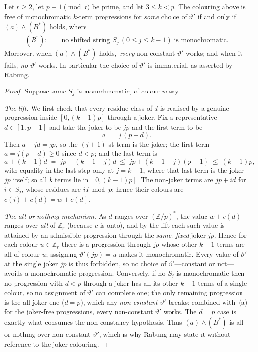\begin{proposition}\label{p:bstar}
Let $r\ge2$, let $p\equiv1\pmod r$ be prime, and let $3\le k<p$. The colouring above is free of monochromatic
$k$-term progressions for \emph{some} choice of $\vartheta'$ if and only if
$(a)\wedge(B^{*})$ holds, where
\[
  (B^{*}):\qquad \text{no shifted string }S_j\ (0\le j\le k-1)\text{ is monochromatic.}
\]
Moreover, when $(a)\wedge(B^{*})$ holds, \emph{every} non-constant $\vartheta'$
works; and when it fails, \emph{no} $\vartheta'$ works. In particular the choice of
$\vartheta'$ is immaterial, as asserted by Rabung.
\end{proposition}

\begin{proof}
Suppose some $S_j$ is monochromatic, of colour $w$ say.

\emph{The lift.} We first check that every residue class of $d$ is realised by a
genuine progression inside $[0,(k-1)p]$ through a joker. Fix a representative
$d\in[1,p-1]$ and take the joker to be $jp$ and the first term to be
\[
  a \;=\; j\,(p-d).
\]
Then $a+jd=jp$, so the $(j+1)$-st term is the joker; the first term
$a=j(p-d)\ge0$ since $d<p$; and the last term is
\[
  a+(k-1)d \;=\; jp+(k-1-j)d \;\le\; jp+(k-1-j)(p-1) \;\le\; (k-1)p ,
\]
with equality in the last step only at $j=k-1$, where that last term is the
joker $jp$ itself; so all $k$ terms lie in $[0,(k-1)p]$. The non-joker terms are $jp+id$ for
$i\in S_j$, whose residues are $id \bmod p$; hence their colours are
$c(i)+c(d)=w+c(d)$.

\emph{The all-or-nothing mechanism.} As $d$ ranges over $(\mathbb{Z}/p)^{*}$, the
value $w+c(d)$ ranges over \emph{all} of $\mathbb{Z}_r$ (because $c$ is onto), and
by the lift each such value is attained by an admissible progression through the
\emph{same, fixed} joker $jp$. Hence for each colour $u\in\mathbb{Z}_r$ there is a
progression through $jp$ whose other $k-1$ terms are all of colour $u$; assigning
$\vartheta'(jp)=u$ makes it monochromatic. Every value of $\vartheta'$ at the
single joker $jp$ is thus forbidden, so no choice of $\vartheta'$---constant or
not---avoids a monochromatic progression. Conversely, if no $S_j$ is
monochromatic then no progression with $d<p$ through a joker has all its other
$k-1$ terms of a single colour, so no assignment of $\vartheta'$ can complete
one; the only remaining progression is the all-joker one ($d=p$), which any
\emph{non-constant} $\vartheta'$ breaks; combined with~(a) for the joker-free
progressions, every non-constant $\vartheta'$ works.  The $d=p$ case is exactly
what consumes the non-constancy hypothesis.  Thus
$(a)\wedge(B^{*})$ is all-or-nothing over non-constant $\vartheta'$, which is
why Rabung may state it without reference to the joker colouring.
\end{proof}

